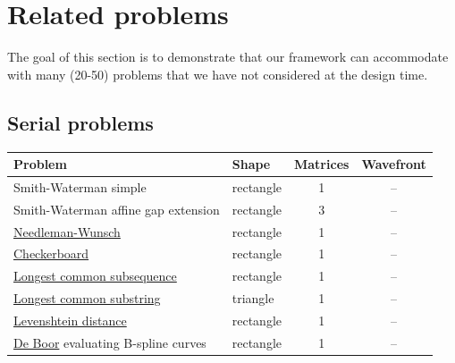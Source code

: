 \newpage
\section{Related problems}
The goal of this section is to demonstrate that our framework can accommodate with many {\color{red} (20-50)} problems that we have not considered at the design time.

\subsection{Serial problems}
\begin{tabular}{llcc} \toprule
\bf Problem & \bf Shape & \bf Matrices & \bf Wavefront \\ \midrule
Smith-Waterman \footnotesize simple & rectangle & 1 & -- \\
Smith-Waterman \footnotesize affine gap extension & rectangle & 3 & -- \\
\href{http://en.wikipedia.org/wiki/Needleman-Wunsch_algorithm}{Needleman-Wunsch} & rectangle & 1 & -- \\

\href{http://en.wikipedia.org/wiki/Dynamic_programming#Checkerboard}{Checkerboard} & rectangle & 1 & -- \\
\href{http://en.wikipedia.org/wiki/Longest_common_subsequence_problem\#Code_for_the_dynamic_programming_solution}{Longest common subsequence} & rectangle & 1 & -- \\
\href{http://en.wikipedia.org/wiki/Longest_common_substring_problem\#Pseudocode}{Longest common substring} & triangle & 1 & -- \\
\href{http://en.wikipedia.org/wiki/Levenshtein_distance\#Computing_Levenshtein_distance}{Levenshtein distance} & rectangle & 1 & -- \\
\href{http://en.wikipedia.org/wiki/De_Boor's_algorithm}{De Boor} \footnotesize evaluating B-spline curves & rectangle & 1 & -- \\
\end{tabular}

